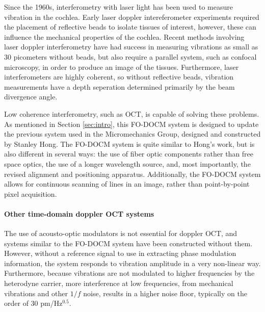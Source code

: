 Since the 1960s, interferometry with laser light has been used to measure vibration in the cochlea. Early laser doppler intereferometer experiments required the placement of reflective beads to isolate tissues of interest, however, these can influence the mechanical properties of the cochlea. \cite{Nuttall2012} Recent methods involving laser doppler interferometry have had success in measuring vibrations as small as 30 picometers without beads, but also require a parallel system, such as confocal microscopy, in order to produce an image of the tissues. Furthermore, laser interferometers are highly coherent, so without reflective beads, vibration measurements have a depth seperation determined primarily by the beam divergence angle. \cite{Jacob2009} \cite{Ren2002} \cite{Ren2011} 

Low coherence interferometry, such as OCT, is capable of solving these problems. As mentioned in Section \ref{sec:intro}, this FO-DOCM system is designed to update the previous system used in the Micromechanics Group, designed and constructed by Stanley Hong. The FO-DOCM system is quite similar to Hong's work, but is also different in several ways: the use of fiber optic components rather than free space optics, the use of a longer wavelength source, and, most importantly, the revised alignment and positioning apparatus. Additionally, the FO-DOCM system allows for continuous scanning of lines in an image, rather than point-by-point pixel acquisition. \cite{hong}

\paragraph{Other time-domain doppler OCT systems} The use of acousto-optic modulators is not essential for doppler OCT, and systems similar to the FO-DOCM system have been constructed without them. However, without a reference signal to use in extracting phase modulation information, the system responds to vibration amplitude in a very non-linear way. Furthermore, because vibrations are not modulated to higher frequencies by the heterodyne carrier, more interference at low frequencies, from mechanical vibrations and other $1/f$ noise, results in a higher noise floor, typically on the order of 30 pm/Hz$^{0.5}$. \cite{Choudhury2006}

